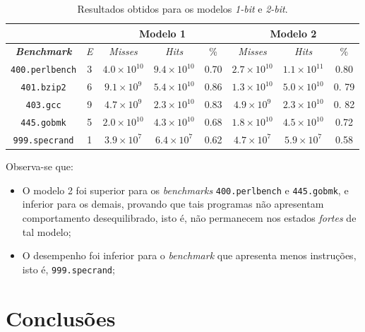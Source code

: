 \documentclass[12pt]{article}
\begin{document}
 \begin{table}[h]
    \centering
	\caption{\label{tab:modelos} Resultados obtidos para os modelos \textit{1-bit}
	e \textit{2-bit}.}
	\begin{tabular}{| c | c | c | c | c | c | c | c |}
		\hline
		\multicolumn{2}{|c|}{} & \multicolumn{3}{c|}{\textbf{Modelo 1}} &
		\multicolumn{3}{|c|}{\textbf{Modelo 2}}	\\ 	\hline 
		\textit{\textbf{Benchmark}} & \textit{E}  & \textit{Misses} & \textit{Hits} &
		\% & \textit{Misses} & \textit{Hits} & \% \\
		\hline \hline \texttt{400.perlbench} & 3 & \(4.0\times10^{10}\) &
		\(9.4\times10^{10}\) & 0.70 & \(2.7\times10^{10}\) & \(1.1\times10^{11}\)
		& 0.80 \\
		\hline \texttt{401.bzip2} & 6 & \(9.1\times10^{9}\) & \(5.4\times10^{10}\) &
		0.86 & \(1.3\times10^{10}\) & \(5.0\times10^{10}\) & 0. 79 \\ \hline
		\texttt{403.gcc} & 9 & \(4.7\times10^{9}\) & \(2.3\times10^{10}\) &
		0.83 & \(4.9\times10^{9}\) & \(2.3\times10^{10}\) & 0. 82 \\ \hline
		\texttt{445.gobmk} & 5 & \(2.0\times10^{10}\) & \(4.3\times10^{10}\)  & 0.68 &
		\(1.8\times10^{10}\) & \(4.5\times10^{10}\) & 0.72 \\ \hline
		\texttt{999.specrand} & 1 & \(3.9\times10^{7}\) & \(6.4\times10^{7}\) & 0.62 &
		\(4.7\times10^{7}\) & \(5.9\times10^{7}\) & 0.58\\ \hline
	\end{tabular}	    
\end{table} 

Observa-se que:

\begin {itemize}
  \item O modelo 2 foi superior para os \textit{benchmarks}
  \texttt{400.perlbench} e \texttt{445.gobmk}, e inferior para os demais,
  provando que tais programas não apresentam comportamento desequilibrado, isto
  é, não permanecem nos estados \textit{fortes} de tal modelo;
  \item O desempenho foi inferior para o \textit{benchmark} que apresenta menos
  instruções, isto é, \texttt{999.specrand}; 
\end{itemize} 

\section{Conclusões}
\end{document}
